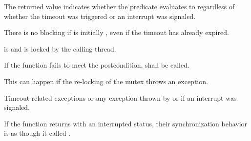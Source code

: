 {\begin{itemdescr}
 \pnum \begin{note} The returned value indicates whether the predicate evaluates to 
        regardless of whether the timeout was triggered 
        {\color{diffcolor} or an interrupt was signaled}. \end{note}

 \pnum \begin{note} There is no blocking if  is initially , even if the
        timeout has already expired. \end{note}

 \pnum \postconditions {} is  and 
        is locked by the calling thread.

 \pnum \remarks
        If the function fails to meet the postcondition, 
        shall be called.
        \begin{note} This can happen if the re-locking of the mutex throws an exception. \end{note}
 
 \pnum \throws Timeout-related
        exceptions or any exception thrown by 
        {\color{diffcolor} or  if an interrupt was signaled}.

{\color{diffcolor}
 \pnum\sync If the function returns with an interrupted status, 
                their synchronization behavior is as though it called .
}%
\end{itemdescr}

}%

